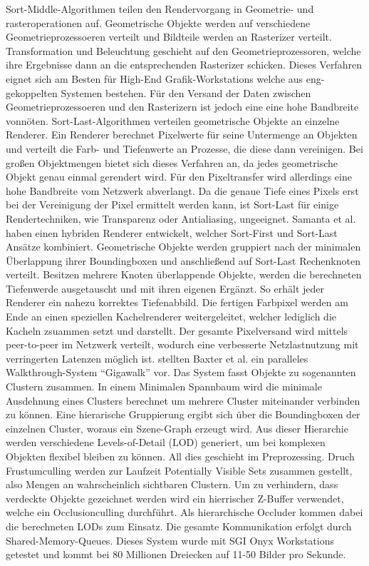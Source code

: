 Sort-Middle-Algorithmen teilen den Rendervorgang in Geometrie- und rasteroperationen auf. Geometrische Objekte werden auf verschiedene Geometrieprozessoeren verteilt und Bildteile werden an Rasterizer verteilt. Transformation und Beleuchtung geschieht auf den Geometrieprozessoren, welche ihre Ergebnisse dann an die entsprechenden Rasterizer schicken. Dieses Verfahren eignet sich am Besten für High-End Grafik-Workstations welche aus eng-gekoppelten Systemen bestehen. Für den Versand der Daten zwischen Geometrieprozessoeren und den Rasterizern ist jedoch eine eine hohe Bandbreite vonnöten.\linebreak\linebreak
Sort-Last-Algorithmen verteilen geometrische Objekte an einzelne Renderer. Ein Renderer berechnet Pixelwerte für seine Untermenge an Objekten und verteilt die Farb- und Tiefenwerte an Prozesse, die diese dann vereinigen. Bei großen Objektmengen bietet sich dieses Verfahren an, da jedes geometrische Objekt genau einmal gerendert wird. Für den Pixeltransfer wird allerdings eine hohe Bandbreite vom Netzwerk abverlangt. Da die genaue Tiefe eines Pixels erst bei der Vereinigung der Pixel ermittelt werden kann, ist Sort-Last für einige Rendertechniken, wie Transparenz oder Antialiasing, ungeeignet.\linebreak\linebreak
Samanta et al.\cite{samanta} haben einen hybriden Renderer entwickelt, welcher Sort-First und Sort-Last Ansätze kombiniert. Geometrische Objekte werden gruppiert nach der minimalen Überlappung ihrer Boundingboxen und anschließend auf Sort-Last Rechenknoten verteilt. Besitzen mehrere Knoten überlappende Objekte, werden die berechneten Tiefenwerde ausgetauscht und mit ihren eigenen Ergänzt. So erhält jeder Renderer ein nahezu korrektes Tiefenabbild. Die fertigen Farbpixel werden am Ende an einen speziellen Kachelrenderer weitergeleitet, welcher lediglich die Kacheln zsuammen setzt und darstellt. Der gesamte Pixelversand wird mittels peer-to-peer im Netzwerk verteilt, wodurch eine verbesserte Netzlastnutzung mit verringerten Latenzen möglich ist. stellten Baxter et al.\cite{baxter} ein paralleles Walkthrough-System ``Gigawalk'' vor. Das System fasst Objekte zu sogenannten Clustern zusammen. In einem Minimalen Spannbaum wird die minimale Ausdehnung eines Clusters berechnet um mehrere Cluster miteinander verbinden zu können. Eine hierarische Gruppierung ergibt sich über die Boundingboxen der einzelnen Cluster, woraus ein Szene-Graph erzeugt wird. Aus dieser Hierarchie werden verschiedene Levels-of-Detail (LOD)\cite{hlod} generiert, um bei komplexen Objekten flexibel bleiben zu können. All dies geschieht im Preprozessing. Druch Frustumculling werden zur Laufzeit Potentially Visible Sets zusammen gestellt, also Mengen an wahrscheinlich sichtbaren Clustern. Um zu verhindern, dass verdeckte Objekte gezeichnet werden wird ein hierrischer Z-Buffer verwendet, welche ein Occlusionculling durchführt. Als hierarchische Occluder kommen dabei die berechneten LODs zum Einsatz. Die gesamte Kommunikation erfolgt durch Shared-Memory-Queues. Dieses System wurde mit SGI Onyx Workstations getestet und kommt bei 80 Millionen Dreiecken auf 11-50 Bilder pro Sekunde.\linebreak
